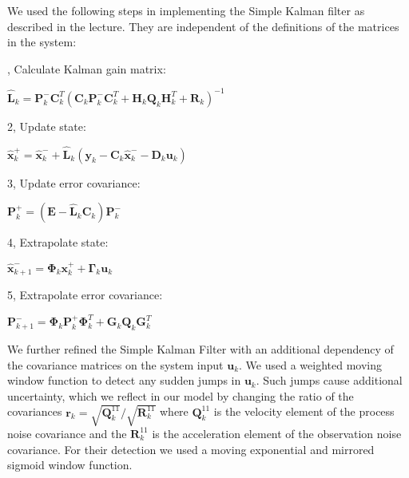 \documentclass[class=article, crop=false]{standalone}
\begin{document}
\vspace{1cm}

We used the following steps in implementing the Simple Kalman filter as described in the lecture\cite{regelungssysteme1}. They are independent of the definitions of the matrices in the system:

, Calculate Kalman gain matrix:
\begin{center}
$ \hat{\textbf{L}}_k = \textbf{P}^-_k \textbf{C}^T_k (\textbf{C}_k \textbf{P}^-_k \textbf{C}^T_k + \textbf{H}_k \textbf{Q}_k \textbf{H}^T_k + \textbf{R}_k)^{-1} $
\end{center}
\vspace{0.5cm}
2, Update state:
\begin{center}
$ \hat{\textbf{x}}^+_k = \hat{\textbf{x}}^-_k + \hat{\textbf{L}}_k (\textbf{y}_k - \textbf{C}_k \hat{\textbf{x}}^-_k - \textbf{D}_k \textbf{u}_k) $
\end{center}
\vspace{0.5cm}
3, Update error covariance:
\begin{center}
$ \textbf{P}^+_k = (\textbf{E} - \hat{\textbf{L}}_k \textbf{C}_k ) \textbf{P}^-_k $
\end{center}
\vspace{0.5cm}
4, Extrapolate state:
\begin{center}
$ \hat{\textbf{x}}^-_{k+1} = \boldsymbol{\Phi}_k \textbf{x}^+_k + \boldsymbol{\Gamma}_k \textbf{u}_k $
\end{center}
\vspace{0.5cm}
5, Extrapolate error covariance:
\begin{center}
$ \textbf{P}^-_{k+1} = \boldsymbol{\Phi}_k \textbf{P}^+_k \boldsymbol{\Phi}^T_k + \textbf{G}_k \textbf{Q}_k \textbf{G}^T_k $
\end{center}

\vspace{0.5cm}

We further refined the Simple Kalman Filter with an additional dependency of the covariance matrices on the system input $ \textbf{u}_k $. We used a weighted moving window function to detect any sudden jumps in $ \textbf{u}_k $. Such jumps cause additional uncertainty, which we reflect in our model by changing the ratio of the covariances $ \textbf{r}_{k} = \sqrt{\textbf{Q}^{11}_k }/\sqrt{\textbf{R}^{11}_k} $ where $ \textbf{Q}^{11}_k $ is the velocity element of the process noise covariance and the $ \textbf{R}^{11}_k $ is the acceleration element of the observation noise covariance. For their detection we used a moving exponential and mirrored sigmoid window function.
\end{document}
